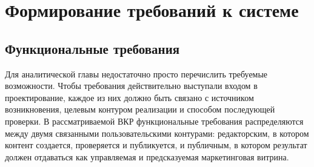 \section{Формирование требований к системе}

\subsection{Функциональные требования}

Для аналитической главы недостаточно просто перечислить требуемые возможности. Чтобы
требования действительно выступали входом в проектирование, каждое из них должно быть
связано с источником возникновения, целевым контуром реализации и способом последующей
проверки. В рассматриваемой ВКР функциональные требования распределяются между двумя
связанными пользовательскими контурами: редакторским, в котором контент создается,
проверяется и публикуется, и публичным, в котором результат должен отдаваться как
управляемая и предсказуемая маркетинговая витрина.

